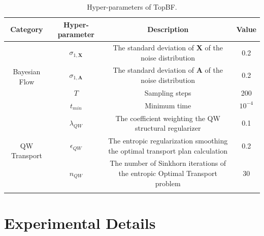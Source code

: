 \documentclass[numsec,webpdf,contemporary,large]{oup-authoring-template}%
\theoremstyle{thmstyleone}%
\theoremstyle{thmstyletwo}%
\theoremstyle{thmstylethree}%
\begin{document}


\begin{table}[t]
  \centering
  \caption{Hyper-parameters of TopBF.}
  \renewcommand \arraystretch{1.0}
  \begin{tabular*}{\textwidth}{@{\extracolsep{\fill}}cccc@{\extracolsep{\fill}}}
    \toprule
    Category & Hyper-parameter & Description & Value \\
    \midrule
    
    \multirow{4}{*}{Bayesian Flow} & $\sigma_{1, \mathbf{X}}$ & The standard deviation of $\mathbf{X}$ of the noise distribution & 0.2 \\
    & $\sigma_{1, \mathbf{A}}$ & The standard deviation of $\mathbf{A}$ of the noise distribution & 0.2 \\
    & $T$ & Sampling steps & 200 \\
    & $t_{min}$ & Minimum time & $10^{-4}$ \\

    \midrule
    \multirow{3}{*}{QW Transport} & $\lambda_{QW}$ & The coefficient weighting the QW structural regularizer & 0.1 \\
    & $\epsilon_{QW}$ & The entropic regularization smoothing the optimal transport plan calculation & 0.2 \\
    & $n_{QW}$ & The number of Sinkhorn iterations of the entropic Optimal Transport problem & 30 \\
    
    \botrule
  \end{tabular*}
  \label{tab:hp}
\end{table}

\section{Experimental Details}

\end{document}
